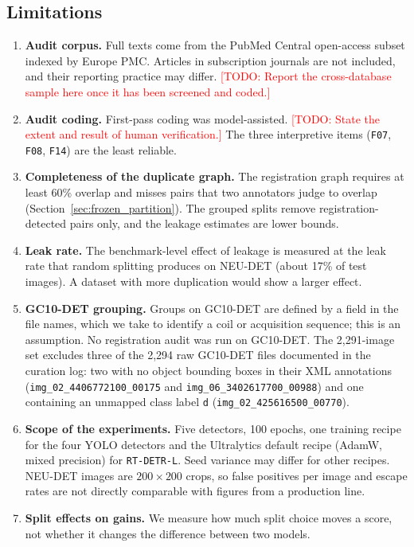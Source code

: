 \documentclass[pdflatex,sn-apa]{sn-jnl}
\newcommand{\todo}[1]{\textcolor{red}{[TODO: #1]}}
\begin{document}
\subsection{Limitations}
\begin{enumerate}[leftmargin=2em, itemsep=0.1em]
    \item \textbf{Audit corpus.} Full texts come from the PubMed Central open-access subset indexed by Europe PMC. Articles in subscription journals are not included, and their reporting practice may differ. \todo{Report the cross-database sample here once it has been screened and coded.}
    \item \textbf{Audit coding.} First-pass coding was model-assisted. \todo{State the extent and result of human verification.} The three interpretive items (\texttt{F07}, \texttt{F08}, \texttt{F14}) are the least reliable.
    \item \textbf{Completeness of the duplicate graph.} The registration graph requires at least 60\% overlap and misses pairs that two annotators judge to overlap (Section~\ref{sec:frozen_partition}). The grouped splits remove registration-detected pairs only, and the leakage estimates are lower bounds.
    \item \textbf{Leak rate.} The benchmark-level effect of leakage is measured at the leak rate that random splitting produces on NEU-DET (about 17\% of test images). A dataset with more duplication would show a larger effect.
    \item \textbf{GC10-DET grouping.} Groups on GC10-DET are defined by a field in the file names, which we take to identify a coil or acquisition sequence; this is an assumption. No registration audit was run on GC10-DET. The 2,291-image set excludes three of the 2,294 raw GC10-DET files documented in the curation log: two with no object bounding boxes in their XML annotations (\texttt{img\_02\_4406772100\_00175} and \texttt{img\_06\_3402617700\_00988}) and one containing an unmapped class label \texttt{d} (\texttt{img\_02\_425616500\_00770}).
    \item \textbf{Scope of the experiments.} Five detectors, 100 epochs, one training recipe for the four YOLO detectors and the Ultralytics default recipe (AdamW, mixed precision) for \texttt{RT-DETR-L}. Seed variance may differ for other recipes. NEU-DET images are $200\times200$ crops, so false positives per image and escape rates are not directly comparable with figures from a production line.
    \item \textbf{Split effects on gains.} We measure how much split choice moves a score, not whether it changes the difference between two models.
\end{enumerate}
\end{document}

